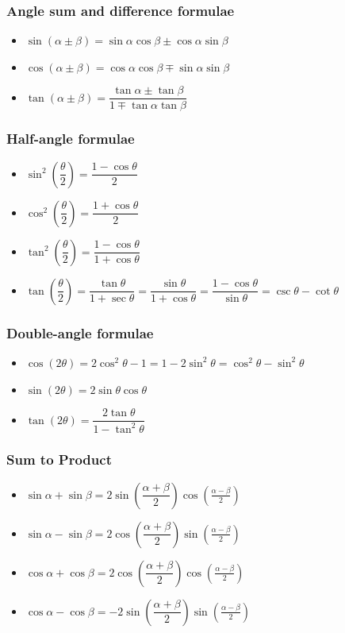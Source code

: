 \documentclass[]{report}
\newcommand \tab[1][1cm]{\hspace*{#1}}
\newcommand{\itemt}{\item \tab}
\begin{document}
\subsubsection{Angle sum and difference formulae}
\begin{itemize}
\itemt \( \sin(\alpha \pm \beta) = \sin \alpha\cos \beta \pm \cos \alpha\sin \beta \)
\itemt \( \cos(\alpha \pm \beta) = \cos \alpha\cos \beta \mp \sin \alpha \sin \beta \)
\itemt \( \tan(\alpha \pm \beta) = \dfrac{\tan \alpha \pm \tan \beta}{1 \mp \tan \alpha \tan \beta}\)
\end{itemize}

\subsubsection{Half-angle formulae}
\begin{itemize}
\itemt \( \sin^2(\dfrac{\theta}{2}) = \dfrac{1-\cos\theta}{2} \)
\itemt \( \cos^2(\dfrac{\theta}{2}) = \dfrac{1+\cos\theta}{2} \)
\itemt \( \tan^2(\dfrac{\theta}{2}) = \dfrac{1-\cos\theta}{1+\cos\theta} \)
\itemt \( \tan(\dfrac{\theta}{2}) = \dfrac{\tan\theta}{1+\sec\theta} = \dfrac{\sin\theta}{1+\cos\theta} = \dfrac{1 - \cos\theta}{\sin\theta} = \csc\theta - \cot\theta\)
\end{itemize}

\subsubsection{Double-angle formulae}
\begin{itemize}
\itemt \( \cos(2\theta) = 2\cos^2 \theta - 1 = 1 - 2\sin^2 \theta = \cos^2\theta - \sin^2 \theta \)
\itemt \( \sin(2\theta) = 2\sin \theta \cos \theta \)
\itemt \( \tan(2\theta) = \dfrac{2\tan \theta}{1-\tan^2 \theta} \)
\end{itemize}

\subsubsection{Sum to Product}
\begin{itemize}
\itemt \( \sin \alpha + \sin \beta = 2\sin(\dfrac{\alpha+\beta}{2})\cos(\frac{\alpha-\beta}{2}) \)
\itemt \( \sin \alpha - \sin \beta = 2\cos(\dfrac{\alpha+\beta}{2})\sin(\frac{\alpha-\beta}{2}) \)
\itemt \( \cos \alpha + \cos \beta = 2\cos(\dfrac{\alpha+\beta}{2})\cos(\frac{\alpha-\beta}{2}) \)
\itemt \( \cos \alpha - \cos \beta = -2\sin(\dfrac{\alpha+\beta}{2})\sin(\frac{\alpha-\beta}{2}) \)
\end{itemize}
\end{document}
